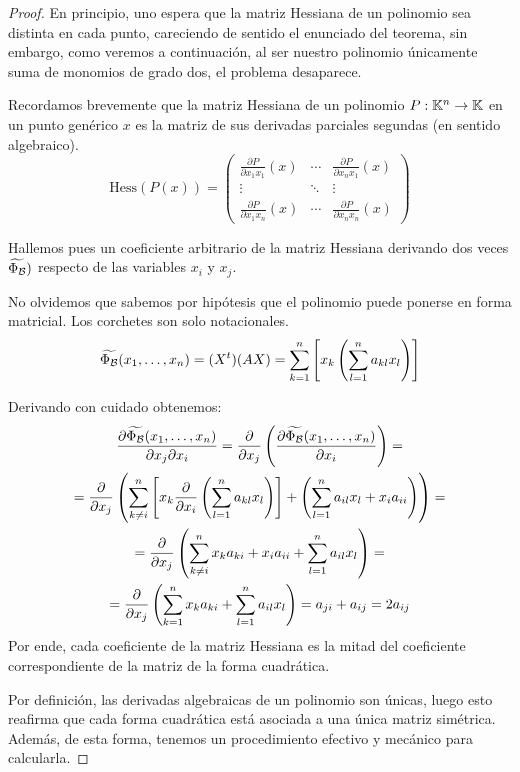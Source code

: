 \begin{proof}
	En principio, uno espera que la matriz Hessiana de un polinomio sea distinta en cada punto, careciendo de sentido el enunciado del teorema, sin embargo, como veremos a continuación, al ser nuestro polinomio únicamente suma de monomios de grado dos, el problema desaparece.
	
	Recordamos brevemente que la matriz Hessiana de un polinomio $P:\mathbb{K}^n\to\mathbb{K}$ en un punto genérico $x$ es la matriz de sus derivadas parciales segundas (en sentido algebraico).
	\[\mathrm{Hess}(P(x))=\begin{pmatrix}
	\frac{\partial P}{\partial x_1x_1}(x) & \cdots &\frac{\partial P}{\partial x_nx_1}(x)\\
	\vdots & \ddots & \vdots\\
	\frac{\partial P}{\partial x_1x_n}(x) & \cdots & \frac{\partial P}{\partial x_nx_n}(x)
	\end{pmatrix}\]
	
	Hallemos pues un coeficiente arbitrario de la matriz Hessiana derivando dos veces $\widetilde{\Phi_{\mathcal{B}}})$ respecto de las variables $x_i$ y $x_j$.
	
	No olvidemos que sabemos por hipótesis que el polinomio puede ponerse en forma matricial. Los corchetes son solo notacionales.
	\[\widetilde{\Phi_{\mathcal{B}}}(x_1,\dots,x_n)=(X^t)(AX)=\sum_{k=1}^{n}\left[x_k\left(\sum_{l=1}^{n}a_{kl}x_l\right)\right]\]
	
	Derivando con cuidado obtenemos:
	\begin{multline}
		\frac{\partial \widetilde{\Phi_{\mathcal{B}}}(x_1,\dots,x_n)}{\partial x_j\partial x_i}=\frac{\partial}{\partial x_j}\left(\frac{\partial \widetilde{\Phi_{\mathcal{B}}}(x_1,\dots,x_n)}{\partial x_i}\right)=\\=\frac{\partial}{\partial x_j}\left(\sum_{k\not= i}^{n}\left[x_k\frac{\partial}{\partial x_i}\left(\sum_{l=1}^{n}a_{kl}x_l\right)\right]+\left(\sum_{l=1}^{n}a_{il}x_l+x_ia_{ii}\right)\right)=\\
		=\frac{\partial}{\partial x_j}\left(\sum_{k\not=i}^{n}x_ka_{ki}+x_ia_{ii}+\sum_{l=1}^{n}a_{il}x_l\right)=\\=\frac{\partial}{\partial x_j}\left(\sum_{k=1}^{n}x_ka_{ki}+\sum_{l=1}^{n}a_{il}x_l\right)=a_{ji}+a_{ij}=2a_{ij}
	\end{multline}
	Por ende, cada coeficiente de la matriz Hessiana es la mitad del coeficiente correspondiente de la matriz de la forma cuadrática.
	
	Por definición, las derivadas algebraicas de un polinomio son únicas, luego esto reafirma que cada forma cuadrática está asociada a una única matriz simétrica. Además, de esta forma, tenemos un procedimiento efectivo y mecánico para calcularla.
\end{proof}
